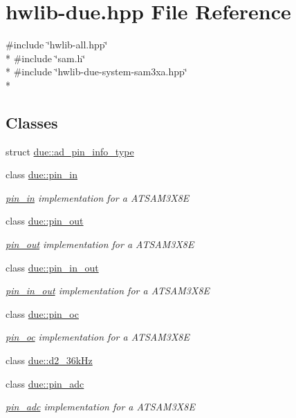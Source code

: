 \hypertarget{hwlib-due_8hpp}{}\section{hwlib-\/due.hpp File Reference}
\label{hwlib-due_8hpp}
{\ttfamily \#include \char`\"{}hwlib-\/all.\+hpp\char`\"{}}\\*
{\ttfamily \#include \char`\"{}sam.\+h\char`\"{}}\\*
{\ttfamily \#include \char`\"{}hwlib-\/due-\/system-\/sam3xa.\+hpp\char`\"{}}\\*
\subsection*{Classes}
\begin{DoxyCompactItemize}
\item 
struct \hyperlink{structdue_1_1ad__pin__info__type}{due\+::ad\+\_\+pin\+\_\+info\+\_\+type}
\item 
class \hyperlink{classdue_1_1pin__in}{due\+::pin\+\_\+in}
\begin{DoxyCompactList}\small\item\em \hyperlink{classdue_1_1pin__in}{pin\+\_\+in} implementation for a A\+T\+S\+A\+M3\+X8E \end{DoxyCompactList}\item 
class \hyperlink{classdue_1_1pin__out}{due\+::pin\+\_\+out}
\begin{DoxyCompactList}\small\item\em \hyperlink{classdue_1_1pin__out}{pin\+\_\+out} implementation for a A\+T\+S\+A\+M3\+X8E \end{DoxyCompactList}\item 
class \hyperlink{classdue_1_1pin__in__out}{due\+::pin\+\_\+in\+\_\+out}
\begin{DoxyCompactList}\small\item\em \hyperlink{classdue_1_1pin__in__out}{pin\+\_\+in\+\_\+out} implementation for a A\+T\+S\+A\+M3\+X8E \end{DoxyCompactList}\item 
class \hyperlink{classdue_1_1pin__oc}{due\+::pin\+\_\+oc}
\begin{DoxyCompactList}\small\item\em \hyperlink{classdue_1_1pin__oc}{pin\+\_\+oc} implementation for a A\+T\+S\+A\+M3\+X8E \end{DoxyCompactList}\item 
class \hyperlink{classdue_1_1d2__36k_hz}{due\+::d2\+\_\+36k\+Hz}
\item 
class \hyperlink{classdue_1_1pin__adc}{due\+::pin\+\_\+adc}
\begin{DoxyCompactList}\small\item\em \hyperlink{classdue_1_1pin__adc}{pin\+\_\+adc} implementation for a A\+T\+S\+A\+M3\+X8E \end{DoxyCompactList}\end{DoxyCompactItemize}
